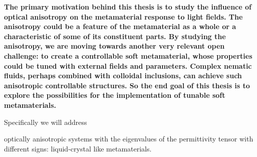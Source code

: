 \documentclass[a4paper,11pt]{article}
\begin{document}
{ \bfseries
The primary motivation behind this thesis is to study the influence of optical anisotropy on the metamaterial response to light fields.
The anisotropy could be a feature of the metamaterial as a whole or a characteristic of some of its constituent parts. 
By studying the anisotropy, we are moving towards another very relevant open challenge: to create a controllable soft metamaterial, whose properties could be tuned with external fields and parameters. 
Complex nematic fluids, perhaps combined with colloidal inclusions, can achieve such anisotropic controllable structures. 
So the end goal of this thesis is to explore the possibilities for the implementation of tunable soft metamaterials. 

% 
% 
% 
% 





Specifically we will address} optically anisotropic systems with the eigenvalues of the permittivity tensor with different signs: liquid-crystal like metamaterials. 
\end{document}
